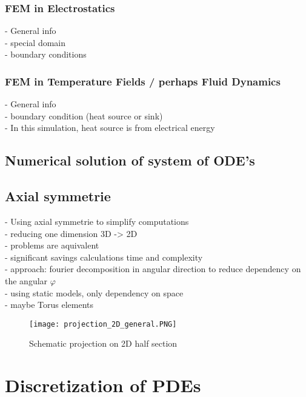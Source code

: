 \documentclass[parskip=half, titlepage=yes, 12pt, BCOR=12mm, DIV=calc]{scrartcl}
\begin{document}
\subsubsection{FEM in Electrostatics}
- General info \\
- special domain \\
- boundary conditions \\

\subsubsection{FEM in Temperature Fields / perhaps Fluid Dynamics}
- General info \\
- boundary condition (heat source or sink) \\
- In this simulation, heat source is from electrical energy \\

\subsection{Numerical solution of system of ODE's}

\subsection{Axial symmetrie}
- Using axial symmetrie to simplify computations \\
- reducing one dimension 3D -> 2D \\
- problems are aquivalent \\
- significant savings calculations time and complexity \\
- approach: fourier decomposition in angular direction to reduce dependency on the angular $\varphi$ \\
- using static models, only dependency on space \\
- maybe Torus elements \\

\begin{figure}[H]
    \centering
    \texttt{[image: projection\_2D\_general.PNG]}
    \caption{Schematic projection on 2D half section}
    \label{projection_2D_general}
\end{figure}



\section{Discretization of PDEs}
\end{document}
